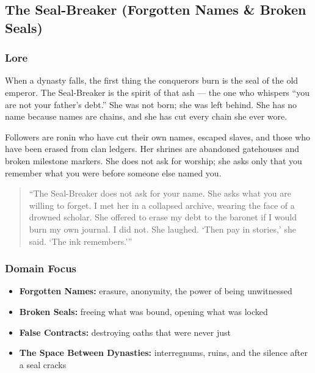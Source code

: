 
\subsection{The Seal-Breaker (Forgotten Names \& Broken Seals)}

\subsubsection*{Lore}
When a dynasty falls, the first thing the conquerors burn is the seal of the old emperor. The Seal-Breaker is the spirit of that ash --- the one who whispers ``you are not your father's debt.'' She was not born; she was left behind. She has no name because names are chains, and she has cut every chain she ever wore.

Followers are ronin who have cut their own names, escaped slaves, and those who have been erased from clan ledgers. Her shrines are abandoned gatehouses and broken milestone markers. She does not ask for worship; she asks only that you remember what you were before someone else named you.

\begin{quote}
``The Seal-Breaker does not ask for your name. She asks what you are willing to forget. I met her in a collapsed archive, wearing the face of a drowned scholar. She offered to erase my debt to the baronet if I would burn my own journal. I did not. She laughed. `Then pay in stories,' she said. `The ink remembers.'''
\end{quote}

\subsubsection*{Domain Focus}
\begin{itemize}
  \item \textbf{Forgotten Names:} erasure, anonymity, the power of being unwitnessed
  \item \textbf{Broken Seals:} freeing what was bound, opening what was locked
  \item \textbf{False Contracts:} destroying oaths that were never just
  \item \textbf{The Space Between Dynasties:} interregnums, ruins, and the silence after a seal cracks
\end{itemize}

